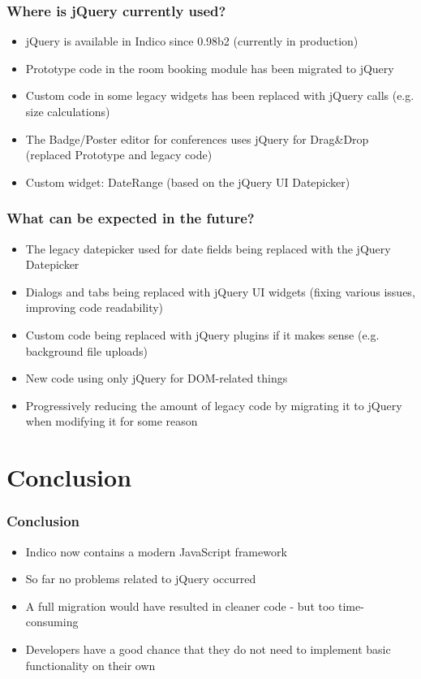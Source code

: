 \documentclass{beamer}
\begin{document}
\begin{frame}
  \frametitle{Where is jQuery currently used?}
  \begin{itemize}
    \item jQuery is available in Indico since 0.98b2 (currently in production)
    \item Prototype code in the room booking module has been migrated to jQuery
    \item Custom code in some legacy widgets has been replaced with jQuery calls (e.g. size calculations)
    \item The Badge/Poster editor for conferences uses jQuery for Drag\&Drop (replaced Prototype and
      legacy code)
    \item Custom widget: DateRange (based on the jQuery UI Datepicker)
  \end{itemize}

  \begin{center}
  \end{center}
\end{frame}

\begin{frame}
  \frametitle{What can be expected in the future?}
  \begin{itemize}
    \item The legacy datepicker used for date fields being replaced with the jQuery Datepicker
    \item Dialogs and tabs being replaced with jQuery UI widgets (fixing various issues, improving
      code readability)
    \item Custom code being replaced with jQuery plugins if it makes sense (e.g. background file
      uploads)
    \item New code using only jQuery for DOM-related things
    \item Progressively reducing the amount of legacy code by migrating it to jQuery when modifying
      it for some reason
  \end{itemize}
\end{frame}

\section{Conclusion}
\begin{frame}
  \frametitle{Conclusion}
  \begin{itemize}
    \item Indico now contains a modern JavaScript framework
    \item So far no problems related to jQuery occurred
    \item A full migration would have resulted in cleaner code - but too time-consuming
    \item Developers have a good chance that they do not need to implement basic functionality on
      their own
  \end{itemize}
\end{frame}
\end{document}
